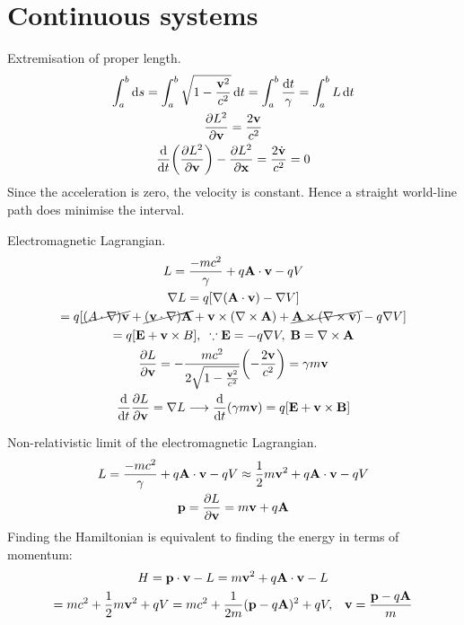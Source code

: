 \documentclass{report}
\begin{document}
\chapter{Continuous systems}

\begin{subquests}
	\item
	\item
	\item
	\item
	\item Extremisation of proper length.
	\begin{gather*}
		\int_a^b \dd{s} = \int_a^b \sqrt{1-\frac{{\vb v}^2}{c^2}} \dd{t} = \int_a^b \frac{\dd{t}}{\gamma} = \int_a^b L \dd{t} \\
		\pdv{L^2}{\vb v} = \frac{2\vb v}{c^2} \\
		\dv{t}\pqty{\pdv{L^2}{\vb v}} - \pdv{L^2}{\vb x} = \frac{2\dot{\vb v}}{c^2} = 0
	\end{gather*}
	Since the acceleration is zero, the velocity is constant. Hence a straight world-line path does minimise the interval.

	\item Electromagnetic Lagrangian.
	\begin{gather*}
		L = \frac{-mc^2}{\gamma} + q{\vb A}\cdot{\vb v} - qV \\
		\nabla{L} = q\bqty{\nabla\pqty{{\vb A}\cdot {\vb v}} - \nabla V} \\
		= q\bqty{\cancel{\vb(A \cdot \nabla)\vb v} + \cancel{(\vb v \cdot \nabla)\vb A} + {\vb v \times (\nabla \times \vb A)} + \cancel{\vb A \times (\nabla \times \vb v)} - q\nabla V} \\
		= q\bqty{\vb E + \vb v \times B},\;\;\because {\vb E} = -q\nabla V, \; \vb B = \nabla \times \vb A\\
		\pdv{L}{\vb v} = -\frac{mc^2}{2\sqrt{1- \frac{{\vb v}^2}{c^2}}}\pqty{-\frac{2\vb v}{c^2}} = \gamma m {\vb v} \\
		\dv{t}\pdv{L}{\vb v} = \nabla L \longrightarrow \dv{t}(\gamma m \vb v) = q\bqty{\vb E + \vb v \times \vb B}
	\end{gather*}

	\item Non-relativistic limit of the electromagnetic Lagrangian.
	\begin{gather*}
		L = \frac{-mc^2}{\gamma} + q{\vb A}\cdot{\vb v} - qV \approx \frac{1}{2}m{\vb v}^2 + q{\vb A}\cdot{\vb v} - qV \\
		{\vb p} = \pdv{L}{\vb v} = m{\vb v} + q{\vb A}
	\end{gather*}
	Finding the Hamiltonian is equivalent to finding the energy in terms of momentum:
	\begin{gather*}
		H = {\vb p\cdot \vb v} - L = m{\vb v}^2 + q{\vb A \cdot \vb v} - L \\ 
		= mc^2 + \frac{1}{2}m{\vb v}^2 + qV = mc^2 + \frac{1}{2m}({\vb p} - q{\vb A})^2 + qV, \;\;\;{\vb v} = \frac{{\vb p} - q{\vb A}}{m}
	\end{gather*}


\end{subquests}
\end{document}
